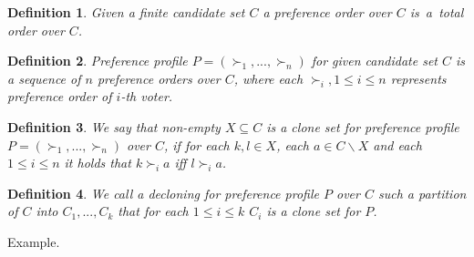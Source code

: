 \newtheorem{preference}{Definition}
\begin{preference}
Given a finite candidate set $C$ a preference order over $C$
is~a~total order over $C$.
\end{preference}

\newtheorem{preference profile}[preference]{Definition}
\begin{preference profile}
Preference profile $P = (\succ_1, ... , \succ_n)$ for given candidate set $C$
is a sequence of $n$ preference orders over $C$,
where each $\succ_i, 1 \leq i \leq n$ represents preference order of $i$-th voter.
\end{preference profile}

\newtheorem{clone set}[preference]{Definition}
\begin{clone set}
We say that non-empty $X \subseteq C$ is a clone set for preference profile $P = (\succ_1, ... , \succ_n)$ over $C$,
if for each $k,l \in X$, each $a \in C \backslash X$ and each $1 \leq i \leq n $ it holds that
$k \succ_i a$ iff $l \succ_i a$.
\end{clone set}

\newtheorem{decloning}[preference]{Definition}
\begin{decloning}
We call a decloning for preference profile $P$ over $C$
such a partition of $C$  into $C_1, ... , C_k$
that for each $1 \leq i \leq k$ $C_i$ is a clone set for $P$.
\end{decloning}

Example.